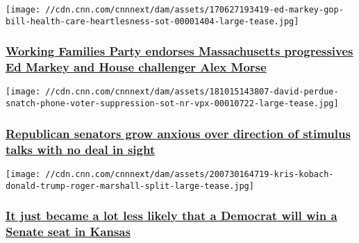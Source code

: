 \href{/2020/08/06/politics/working-families-party-ed-markey-alex-morse/index.html}{}

\texttt{[image: //cdn.cnn.com/cnnnext/dam/assets/170627193419-ed-markey-gop-bill-health-care-heartlesness-sot-00001404-large-tease.jpg]}

\hypertarget{working-families-party-endorses-massachusetts-progressives-ed-markey-and-house-challenger-alex-morse}{%
\subsubsection{\texorpdfstring{\href{/2020/08/06/politics/working-families-party-ed-markey-alex-morse/index.html}{Working
Families Party endorses Massachusetts progressives Ed Markey and House
challenger Alex
Morse}}{Working Families Party endorses Massachusetts progressives Ed Markey and House challenger Alex Morse}}\label{working-families-party-endorses-massachusetts-progressives-ed-markey-and-house-challenger-alex-morse}}

\href{/2020/08/05/politics/republicans-stimulus-negotiations/index.html}{}

\texttt{[image: //cdn.cnn.com/cnnnext/dam/assets/181015143807-david-perdue-snatch-phone-voter-suppression-sot-nr-vpx-00010722-large-tease.jpg]}

\hypertarget{republican-senators-grow-anxious-over-direction-of-stimulus-talks-with-no-deal-in-sight}{%
\subsubsection{\texorpdfstring{\href{/2020/08/05/politics/republicans-stimulus-negotiations/index.html}{Republican
senators grow anxious over direction of stimulus talks with no deal in
sight}}{Republican senators grow anxious over direction of stimulus talks with no deal in sight}}\label{republican-senators-grow-anxious-over-direction-of-stimulus-talks-with-no-deal-in-sight}}

\href{/2020/08/05/opinions/kansas-primary-election-kobach-marshall-stewart/index.html}{}

\texttt{[image: //cdn.cnn.com/cnnnext/dam/assets/200730164719-kris-kobach-donald-trump-roger-marshall-split-large-tease.jpg]}

\hypertarget{it-just-became-a-lot-less-likely-that-a-democrat-will-win-a-senate-seat-in-kansas}{%
\subsubsection{\texorpdfstring{\href{/2020/08/05/opinions/kansas-primary-election-kobach-marshall-stewart/index.html}{It
just became a lot less likely that a Democrat will win a Senate seat in
Kansas}}{It just became a lot less likely that a Democrat will win a Senate seat in Kansas}}\label{it-just-became-a-lot-less-likely-that-a-democrat-will-win-a-senate-seat-in-kansas}}


